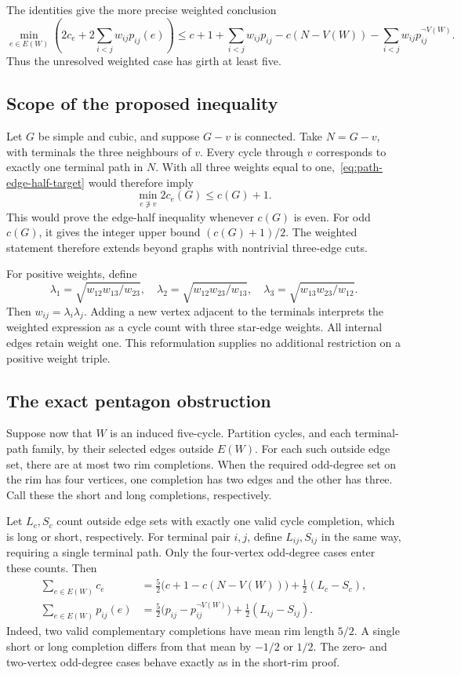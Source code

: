 The identities give the more precise weighted conclusion
\[
 \min_{e\in E(W)}\left(2c_e+2\sum_{i<j}w_{ij}p_{ij}(e)\right)
 \le c+1+\sum_{i<j}w_{ij}p_{ij}
       -c(N-V(W))-\sum_{i<j}w_{ij}p_{ij}^{\neg V(W)}.
\]
Thus the unresolved weighted case has girth at least five.

\subsection{Scope of the proposed inequality}

Let $G$ be simple and cubic, and suppose $G-v$ is connected.
Take $N=G-v$, with terminals the three neighbours of $v$.
Every cycle through $v$ corresponds to exactly one terminal path in $N$.
With all three weights equal to one,~\eqref{eq:path-edge-half-target} would therefore imply
\[
 \min_{e\not\ni v}2c_e(G)\le c(G)+1.
\]
This would prove the edge-half inequality whenever $c(G)$ is even.
For odd $c(G)$, it gives the integer upper bound $(c(G)+1)/2$.
The weighted statement therefore extends beyond graphs with nontrivial three-edge cuts.

For positive weights, define
\[
 \lambda_1=\sqrt{w_{12}w_{13}/w_{23}},\quad
 \lambda_2=\sqrt{w_{12}w_{23}/w_{13}},\quad
 \lambda_3=\sqrt{w_{13}w_{23}/w_{12}}.
\]
Then $w_{ij}=\lambda_i\lambda_j$.
Adding a new vertex adjacent to the terminals interprets the weighted expression as a cycle count with three star-edge weights.
All internal edges retain weight one.
This reformulation supplies no additional restriction on a positive weight triple.

\subsection{The exact pentagon obstruction}

Suppose now that $W$ is an induced five-cycle.
Partition cycles, and each terminal-path family, by their selected edges outside $E(W)$.
For each such outside edge set, there are at most two rim completions.
When the required odd-degree set on the rim has four vertices, one completion has two edges and the other has three.
Call these the short and long completions, respectively.

Let $L_c,S_c$ count outside edge sets with exactly one valid cycle completion, which is long or short, respectively.
For terminal pair $i,j$, define $L_{ij},S_{ij}$ in the same way, requiring a single terminal path.
Only the four-vertex odd-degree cases enter these counts.
Then
\begin{align}
 \sum_{e\in E(W)}c_e
 &=\frac52\bigl(c+1-c(N-V(W))\bigr)+\frac12(L_c-S_c),
 \label{eq:path-edge-half-pentagon-cycles}\\
 \sum_{e\in E(W)}p_{ij}(e)
 &=\frac52\bigl(p_{ij}-p_{ij}^{\neg V(W)}\bigr)
       +\frac12(L_{ij}-S_{ij}).
 \label{eq:path-edge-half-pentagon-paths}
\end{align}
Indeed, two valid complementary completions have mean rim length $5/2$.
A single short or long completion differs from that mean by $-1/2$ or $1/2$.
The zero- and two-vertex odd-degree cases behave exactly as in the short-rim proof.

